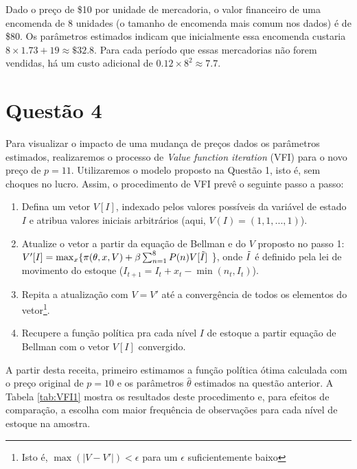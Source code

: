 \documentclass{article}
\begin{document}
Dado o preço de \$10 por unidade de mercadoria, o valor financeiro de uma encomenda de 8 unidades (o tamanho de encomenda mais comum nos dados) é de \$80. Os parâmetros estimados indicam que inicialmente essa encomenda custaria $8 \times 1.73 + 19 \approx \$32.8$. Para cada período que essas mercadorias não forem vendidas, há um custo adicional de $0.12 \times 8^2 \approx 7.7$.

\section*{Questão 4}

Para visualizar o impacto de uma mudança de preços dados os parâmetros estimados, realizaremos o processo de \textit{Value function iteration} (VFI) para o novo preço de $p=11$. Utilizaremos o modelo proposto na Questão 1, isto é, sem choques no lucro. Assim, o procedimento de VFI prevê o seguinte passo a passo:

\begin{enumerate}
    \item Defina um vetor $V[I]$, indexado pelos valores possíveis da variável de estado $I$ e atribua valores iniciais arbitrários (aqui, $V(I) = \left( 1, 1, ..., 1 \right)$).
    \item Atualize o vetor a partir da equação de Bellman e do $V$ proposto no passo 1: $V'[I] = \max_x \{ \pi(\theta,x,V) + \beta \sum_{n=1}^8 P(n) V[\Tilde{I}]$ \}, onde $\Tilde{I}$ é definido pela lei de movimento do estoque ($I_{t+1} = I_t + x_t - \min(n_t,I_t)$).
    \item Repita a atualização com $V = V'$ até a convergência de todos os elementos do vetor\footnote{Isto é, $\max(|V-V'|) < \epsilon$ para um $\epsilon$ suficientemente baixo}.
    \item Recupere a função política pra cada nível $I$ de estoque a partir equação de Bellman com o vetor $V[I]$ convergido.
\end{enumerate}

A partir desta receita, primeiro estimamos a função política ótima calculada com o preço original de $p=10$ e os parâmetros $\hat{\theta}$ estimados na questão anterior. A Tabela \ref{tab:VFI1} mostra os resultados deste procedimento e, para efeitos de comparação, a escolha com maior frequência de observações para cada nível de estoque na amostra.
\end{document}
